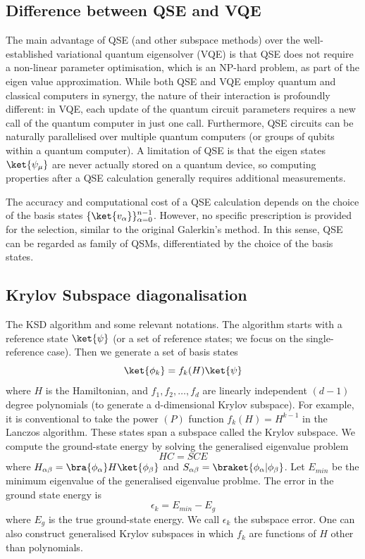 \documentclass[12pt, oneside]{book}
\theoremstyle{definition}
\theoremstyle{definition}
\theoremstyle{remark}
\begin{document}
\subsection{Difference between QSE and VQE}
The main advantage of QSE (and other subspace methods) over the well-established variational quantum eigensolver (VQE) is that QSE does not require a non-linear parameter optimisation, which is an NP-hard problem, as part of the eigen value approximation. While both QSE and VQE employ quantum and classical computers in synergy, the nature of their interaction is profoundly different: in VQE, each update of the quantum circuit parameters requires a new call of the quantum computer in just one call. Furthermore, QSE circuits can be naturally parallelised over multiple quantum computers (or groups of qubits within a quantum computer). A limitation of QSE is that the eigen states $\ket{\psi_{\mu}}$ are never actually stored on a quantum device, so computing properties after a QSE calculation generally requires additional measurements.

The accuracy and computational cost of a QSE calculation depends on the choice of the basis states $\{\ket{v_{\alpha}}\}_{\alpha=0}^{n-1}$. However, no specific prescription is provided for the selection, similar to the original Galerkin's method. In this sense, QSE can be regarded as family of QSMs, differentiated by the choice of the basis states.

\subsection{Krylov Subspace diagonalisation}
The KSD algorithm and some relevant notations. The algorithm starts with a reference state $\ket{\psi}$ (or a set of reference states; we focus on the single-reference case). Then we generate a set of basis states
\[
\ket{\phi_k}=f_k(H)\ket{\psi}
\]
where $H$ is the Hamiltonian, and $f_1,f_2,\ldots,f_d$ are linearly independent $(d-1)$ degree polynomials (to generate a d-dimensional Krylov subspace). For example, it is conventional to take the power $(P)$ function $f_k(H)=H^{k-1}$ in the Lanczos algorithm. These states span a subspace called the Krylov subspace. We compute the ground-state energy by solving the generalised eigenvalue problem
\[
HC=SCE
\]
where $H_{\alpha\beta}=\bra{\phi_{\alpha}}H\ket{\phi_{\beta}}$ and $S_{\alpha\beta}=\braket{\phi_{\alpha}|\phi_\beta}$. Let $E_{min}$ be the minimum eigenvalue of the generalised eigenvalue problme. The error in the ground state energy is 
\[
\epsilon_k=E_{min}-E_g
\]
where $E_g$ is the true ground-state energy. We call $\epsilon_k$ the subspace error. One can also construct generalised Krylov subspaces in which $f_k$ are functions of $H$ other than polynomials.
\end{document}
